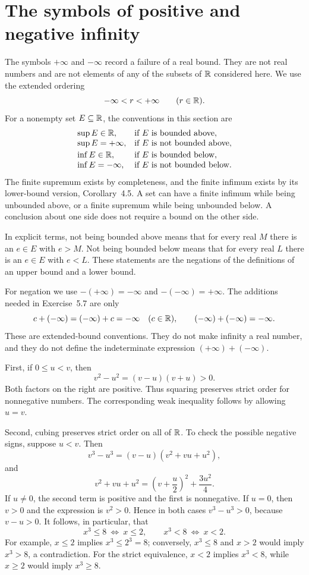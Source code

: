 \section{The symbols of positive and negative infinity}
\label{sec:positive-negative-infinity}

The symbols $+\infty$ and $-\infty$ record a failure of a real bound.
They are not real numbers and are not elements of any of the subsets of
$\mathbb{R}$ considered here. We use the extended ordering
\[
 -\infty<r<+\infty\qquad(r\in\mathbb{R}).
\]
For a nonempty set $E\subseteq\mathbb{R}$, the conventions in this section are
\[
 \begin{array}{ll}
 \sup E\in\mathbb{R},&\text{if $E$ is bounded above},\\
 \sup E=+\infty,&\text{if $E$ is not bounded above},\\[2pt]
 \inf E\in\mathbb{R},&\text{if $E$ is bounded below},\\
 \inf E=-\infty,&\text{if $E$ is not bounded below}.
 \end{array}
\]
The finite supremum exists by completeness, and the finite infimum
exists by its lower-bound version, Corollary~4.5. A set can have a finite
infimum while being unbounded above, or a finite supremum while being
unbounded below. A conclusion about one side does not require a bound
on the other side.

In explicit terms, not being bounded above means that for every real
$M$ there is an $e\in E$ with $e>M$. Not being bounded below means that
for every real $L$ there is an $e\in E$ with $e<L$. These statements
are the negations of the definitions of an upper bound and a lower bound.

For negation we use $-(+\infty)=-\infty$ and $-(-\infty)=+\infty$.
The additions needed in Exercise~5.7 are only
\[
 c+(-\infty)=(-\infty)+c=-\infty\quad(c\in\mathbb{R}),
 \qquad (-\infty)+(-\infty)=-\infty.
\]
These are extended-bound conventions. They do not make infinity a real
number, and they do not define the indeterminate expression
$(+\infty)+(-\infty)$.

First, if $0\le u<v$, then
\[
 v^2-u^2=(v-u)(v+u)>0.
\]
Both factors on the right are positive. Thus squaring preserves strict
order for nonnegative numbers. The corresponding weak inequality follows
by allowing $u=v$.

Second, cubing preserves strict order on all of $\mathbb{R}$. To check the
possible negative signs, suppose $u<v$. Then
\[
 v^3-u^3=(v-u)(v^2+vu+u^2),
\]
and
\[
 v^2+vu+u^2=\left(v+\frac u2\right)^2+\frac{3u^2}{4}.
\]
If $u\ne0$, the second term is positive and the first is nonnegative.
If $u=0$, then $v>0$ and the expression is $v^2>0$. Hence in both cases
$v^3-u^3>0$, because $v-u>0$. It follows, in particular, that
\[
 x^3\le8\ \Longleftrightarrow\ x\le2,
 \qquad
 x^3<8\ \Longleftrightarrow\ x<2.
\]
For example, $x\le2$ implies $x^3\le2^3=8$; conversely, $x^3\le8$
and $x>2$ would imply $x^3>8$, a contradiction. For the strict
equivalence, $x<2$ implies $x^3<8$, while $x\ge2$ would imply
$x^3\ge8$.

